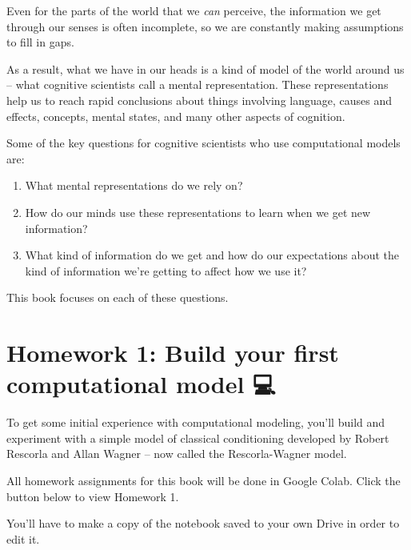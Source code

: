 \documentclass[
  letterpaper,
  DIV=11,
  numbers=noendperiod]{scrreprt}
\makeatletter
\newcommand*\pandocbounded[1]{%
  \sbox\pandoc@box{#1}%
  \Gscale@div\@tempa{\textheight}{\dimexpr\ht\pandoc@box+\dp\pandoc@box\relax}%
  \Gscale@div\@tempb{\linewidth}{\wd\pandoc@box}%
  \ifdim\@tempb\p@<\@tempa\p@\let\@tempa\@tempb\fi%
  \ifdim\@tempa\p@<\p@\scalebox{\@tempa}{\usebox\pandoc@box}%
  \else\usebox{\pandoc@box}%
  \fi%
}
\providecommand{\tightlist}{%
  \setlength{\itemsep}{0pt}\setlength{\parskip}{0pt}}
\makeatother
\begin{document}
Even for the parts of the world that we \emph{can} perceive, the
information we get through our senses is often incomplete, so we are
constantly making assumptions to fill in gaps.

As a result, what we have in our heads is a kind of model of the world
around us -- what cognitive scientists call a mental representation.
These representations help us to reach rapid conclusions about things
involving language, causes and effects, concepts, mental states, and
many other aspects of cognition.

Some of the key questions for cognitive scientists who use computational
models are:

\begin{enumerate}
\def\labelenumi{\arabic{enumi}.}
\tightlist
\item
  What mental representations do we rely on?
\item
  How do our minds use these representations to learn when we get new
  information?
\item
  What kind of information do we get and how do our expectations about
  the kind of information we're getting to affect how we use it?
\end{enumerate}

This book focuses on each of these questions.

\section{Homework 1: Build your first computational model
💻}\label{homework-1-build-your-first-computational-model}

To get some initial experience with computational modeling, you'll build
and experiment with a simple model of classical conditioning developed
by Robert Rescorla and Allan Wagner -- now called the Rescorla-Wagner
model.

All homework assignments for this book will be done in Google Colab.
Click the button below to view Homework 1.

\href{https://colab.research.google.com/drive/1tOD-ChXJ2MlsIqU85yWzSqZnmg64KcRv?usp=sharing}{\pandocbounded{}}

\begin{tcolorbox}[enhanced jigsaw, opacitybacktitle=0.6, colback=white, title=\textcolor{quarto-callout-note-color}{\faInfo}\hspace{0.5em}{Note}, breakable, arc=.35mm, toptitle=1mm, rightrule=.15mm, toprule=.15mm, bottomtitle=1mm, coltitle=black, left=2mm, opacityback=0, colframe=quarto-callout-note-color-frame, leftrule=.75mm, bottomrule=.15mm, colbacktitle=quarto-callout-note-color!10!white, titlerule=0mm]

You'll have to make a copy of the notebook saved to your own Drive in
order to edit it.

\end{tcolorbox}
\end{document}

